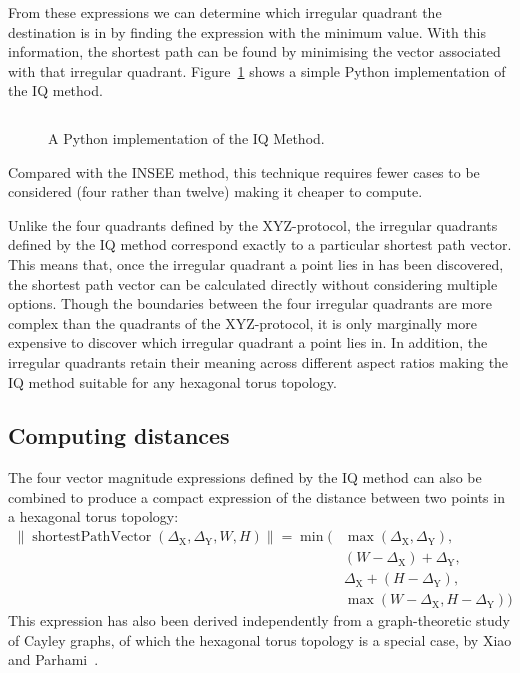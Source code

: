 			From these expressions we can determine which irregular quadrant the
			destination is in by finding the expression with the minimum value. With
			this information, the shortest path can be found by minimising the vector
			associated with that irregular quadrant.  Figure~\ref{fig:iqmethod.py}
			shows a simple Python implementation of the IQ method.
			
			\begin{figure}
				\inputminted{python}{figures/iqmethod.py}
				
				\caption{A Python implementation of the IQ Method.}
				\label{fig:iqmethod.py}
			\end{figure}
			
			Compared with the INSEE method, this technique requires fewer cases to be
			considered (four rather than twelve) making it cheaper to compute.
			
			Unlike the four quadrants defined by the XYZ-protocol, the irregular
			quadrants defined by the IQ method correspond exactly to a particular
			shortest path vector. This means that, once the irregular quadrant a
			point lies in has been discovered, the shortest path vector can be
			calculated directly without considering multiple options. Though the
			boundaries between the four irregular quadrants are more complex than the
			quadrants of the XYZ-protocol, it is only marginally more expensive to
			discover which irregular quadrant a point lies in. In addition, the
			irregular quadrants retain their meaning across different aspect ratios
			making the IQ method suitable for any hexagonal torus topology.
		
		\subsection{Computing distances}
		
			The four vector magnitude expressions defined by the IQ method can also
			be combined to produce a compact expression of the distance between two
			points in a hexagonal torus topology:
			\begin{align*}
				\|\operatorname{shortestPathVector}(\Delta_\textrm{X}, \Delta_\textrm{Y}, W, H)\| =
				\operatorname{min}(&\operatorname{max}(\Delta_\textrm{X}, \Delta_\textrm{Y}),\\
				                   &(W - \Delta_\textrm{X}) + \Delta_\textrm{Y},\\
				                   &\Delta_\textrm{X} + (H - \Delta_\textrm{Y}),\\
				                   &\operatorname{max}(W-\Delta_\textrm{X}, H-\Delta_\textrm{Y}))
			\end{align*}
			This expression has also been derived independently from a
			graph-theoretic study of Cayley graphs, of which the hexagonal torus
			topology is a special case, by Xiao and Parhami~\cite{xiao04}.
		
